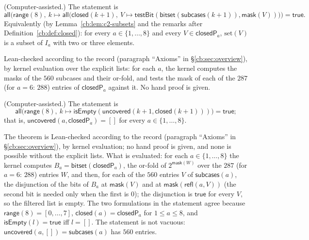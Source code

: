 \begin{fact}\label{cb:fact:c2-sub}
(Computer-assisted.) The statement is
\[
\mathsf{all}\Big(\mathsf{range}(8),\ k\mapsto\mathsf{all}\big(\mathsf{closed}(k+1),\ V\mapsto
\mathsf{testBit}(\mathsf{bitset}(\mathsf{subcases}(k+1)),\mathsf{mask}(V))\big)\Big)=\mathsf{true}.
\]
Equivalently (by Lemma~\ref{cb:lem:c2-subsets} and the remarks after Definition~\ref{cb:def:closed}): for every
$a\in\{1,\dots,8\}$ and every $V\in\mathsf{closedP}_a$, $\mathrm{set}(V)$ is a subset of $I_a$ with two or three
elements.
\end{fact}

Lean-checked according to the record (paragraph ``Axioms'' in \S\ref{cb:sec:overview}), by kernel evaluation over
the explicit lists: for each $a$, the kernel computes the
masks of the $560$ subcases and their or-fold, and tests the mask of each of the $287$ (for $a=6$: $288$) entries of
$\mathsf{closedP}_a$ against it. No hand proof is given.

\begin{theorem}\label{cb:thm:c2}
(Computer-assisted.) The statement is
\[
\mathsf{all}\big(\mathsf{range}(8),\ k\mapsto\mathsf{isEmpty}(\mathsf{uncovered}(k+1,\mathsf{closed}(k+1)))\big)=
\mathsf{true};
\]
that is, $\mathsf{uncovered}(a,\mathsf{closedP}_a)=[]$ for every $a\in\{1,\dots,8\}$.
\end{theorem}

The theorem is Lean-checked according to the record (paragraph ``Axioms'' in \S\ref{cb:sec:overview}), by kernel
evaluation; no hand proof is given, and none is possible
without the explicit lists. What is evaluated: for each $a\in\{1,\dots,8\}$ the kernel computes
$B_a=\mathsf{bitset}(\mathsf{closedP}_a)$, the or-fold of $2^{\mathsf{mask}(W)}$ over the $287$ (for $a=6$: $288$)
entries $W$, and then, for each of the $560$ entries $V$ of $\mathsf{subcases}(a)$, the disjunction of the bits of
$B_a$ at $\mathsf{mask}(V)$ and at $\mathsf{mask}(\mathsf{refl}(a,V))$ (the second bit is needed only when the first
is $0$); the disjunction is $\mathsf{true}$ for every $V$, so the filtered list is empty. The two formulations in the statement agree because $\mathsf{range}(8)=[0,\dots,7]$,
$\mathsf{closed}(a)=\mathsf{closedP}_a$ for $1\le a\le8$, and $\mathsf{isEmpty}(l)=\mathsf{true}$ iff $l=[]$. The
statement is not vacuous: $\mathsf{uncovered}(a,[])=\mathsf{subcases}(a)$ has $560$ entries.


